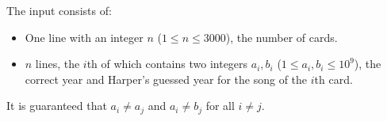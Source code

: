 
    The input consists of:
    \begin{itemize}
        \item One line with an integer $n$ ($1 \le n \le 3000$), the number of cards.
        \item $n$ lines, the $i$th of which contains two integers $a_i, b_i$ ($1 \le a_i, b_i \le 10^9$), the correct year and Harper's guessed year for the song of the $i$th card.
    \end{itemize}
    It is guaranteed that $a_i \ne a_j$ and $a_i \ne b_j$ for all $i \ne j$.
